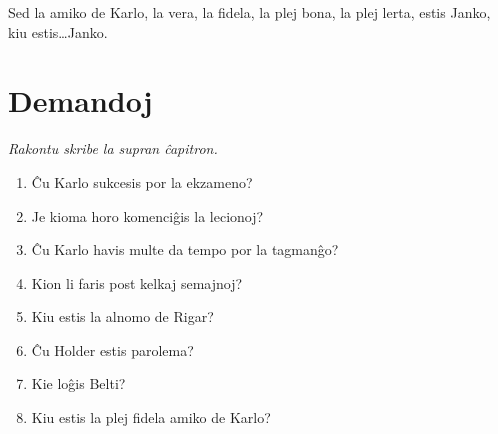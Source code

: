 Sed la amiko de Karlo, la vera, la fidela, la plej bona, la plej lerta, estis Janko, kiu estis\ldots{}Janko.

\section*{Demandoj}

\emph{Rakontu skribe la supran ĉapitron.}

\begin{enumerate}
    \item  Ĉu Karlo sukcesis por la ekzameno?
    \item  Je kioma horo komenciĝis la lecionoj?
    \item  Ĉu Karlo havis multe da tempo por la tagmanĝo?
    \item  Kion li faris post kelkaj semajnoj?
    \item  Kiu estis la alnomo de Rigar?
    \item  Ĉu Holder estis parolema?
    \item  Kie loĝis Belti?
    \item  Kiu estis la plej fidela amiko de Karlo?
\end{enumerate}
